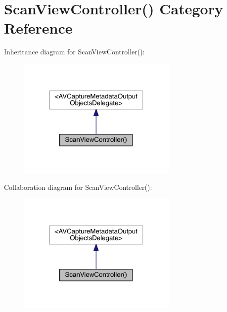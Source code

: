 \section{Scan\+View\+Controller() Category Reference}
\label{category_scan_view_controller_07_08}


Inheritance diagram for Scan\+View\+Controller()\+:
\nopagebreak
\begin{figure}[H]
\begin{center}
\leavevmode
\includegraphics[width=220pt]{category_scan_view_controller_07_08__inherit__graph}
\end{center}
\end{figure}


Collaboration diagram for Scan\+View\+Controller()\+:
\nopagebreak
\begin{figure}[H]
\begin{center}
\leavevmode
\includegraphics[width=220pt]{category_scan_view_controller_07_08__coll__graph}
\end{center}
\end{figure}
